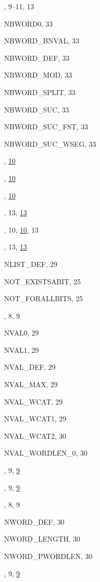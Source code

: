 \begin{theindex}
  \item {}, 9--11, 13
  \item {\ptt NBWORD0}, 33
  \item {\ptt NBWORD\_BNVAL}, 33
  \item {\ptt NBWORD\_DEF}, 33
  \item {\ptt NBWORD\_MOD}, 33
  \item {\ptt NBWORD\_SPLIT}, 33
  \item {\ptt NBWORD\_SUC}, 33
  \item {\ptt NBWORD\_SUC\_FST}, 33
  \item {\ptt NBWORD\_SUC\_WSEG}, 33
  \item {}, \ul{10}
  \item {}, \ul{10}
  \item {}, \ul{10}
  \item {}, 13, \ul{13}
  \item {}, 10, \ul{10}, 13
  \item {}, 13, \ul{13}
  \item {\ptt NLIST\_DEF}, 29
  \item {\ptt NOT\_EXISTSABIT}, 25
  \item {\ptt NOT\_FORALLBITS}, 25
  \item {}, 8, 9
  \item {\ptt NVAL0}, 29
  \item {\ptt NVAL1}, 29
  \item {\ptt NVAL\_DEF}, 29
  \item {\ptt NVAL\_MAX}, 29
  \item {\ptt NVAL\_WCAT}, 29
  \item {\ptt NVAL\_WCAT1}, 29
  \item {\ptt NVAL\_WCAT2}, 30
  \item {\ptt NVAL\_WORDLEN\_0}, 30
  \item {}, 9, \ul{9}
  \item {}, 9, \ul{9}
  \item {}, 8, 9
  \item {\ptt NWORD\_DEF}, 30
  \item {\ptt NWORD\_LENGTH}, 30
  \item {\ptt NWORD\_PWORDLEN}, 30
  \item {}, 9, \ul{9}


\end{theindex}
